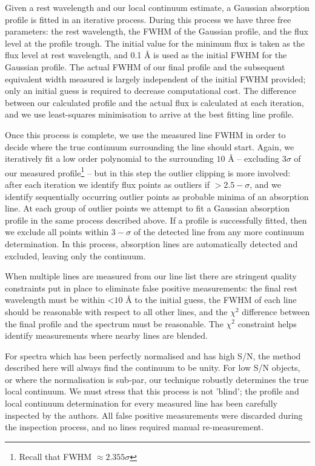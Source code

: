 \documentclass{emulateapj}
\begin{document}
Given a rest wavelength and our local continuum estimate, a Gaussian absorption profile is fitted in an iterative process. During this process we have three free parameters: the rest wavelength, the FWHM of the Gaussian profile, and the flux level at the profile trough. The initial value for the minimum flux is taken as the flux level at rest wavelength, and 0.1 \AA{} is used as the initial FWHM for the Gaussian profile. The actual FWHM of our final profile and the subsequent equivalent width measured is largely independent of the initial FWHM provided; only an initial guess is required to decrease computational cost. The difference between our calculated profile and the actual flux is calculated at each iteration, and we use least-squares minimisation to arrive at the best fitting line profile. 

Once this process is complete, we use the measured line FWHM in order to decide where the true continuum surrounding the line should start. Again, we iteratively fit a low order polynomial to the surrounding $10$ \AA{} \--- excluding $3\sigma$ of our measured profile\footnote{Recall that FWHM $\approx 2.355\sigma$} \--- but in this step the outlier clipping is more involved: after each iteration we identify flux points as outliers if $>2.5-\sigma$, and we identify sequentially occurring outlier points as probable minima of an absorption line. At each group of outlier points we attempt to fit a Gaussian absorption profile in the same process described above. If a profile is successfully fitted, then we exclude all points within $3-\sigma$ of the detected line from any more continuum determination. In this process, absorption lines are automatically detected and excluded, leaving only the continuum.

When multiple lines are measured from our line list there are stringent quality constraints put in place to eliminate false positive measurements: the final rest wavelength must be within <$10$ \AA{} to the initial guess, the FWHM of each line should be reasonable with respect to all other lines, and the $\chi^2$ difference between the final profile and the spectrum must be reasonable. The $\chi^2$ constraint helps identify measurements where nearby lines are blended. 

For spectra which has been perfectly normalised and has high S/N, the method described here will always find the continuum to be unity. For low S/N objects, or where the normalisation is sub-par, our technique robustly determines the true local continuum. We must stress that this process is not 'blind'; the profile and local continuum determination for every measured line has been carefully inspected by the authors. All false positive measurements were discarded during the inspection process, and no lines required manual re-measurement.
\end{document}
